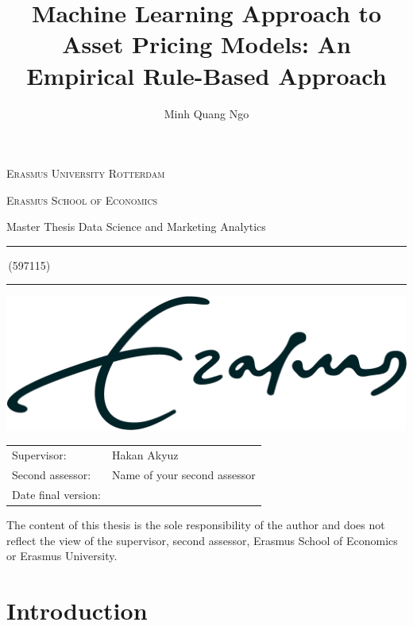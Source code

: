 \documentclass[a4paper,11pt]{article}
\author{Minh Quang Ngo}
\title{Machine Learning Approach to Asset Pricing Models: An Empirical Rule-Based Approach}
\newcommand{\studentnumber}{597115}
\newcommand{\program}{Data Science and Marketing Analytics}
\newcommand{\supervisor}{Hakan Akyuz}
\newcommand{\secondassesor}{Name of your second assessor}
\begin{document}
\begin{titlepage}
\makeatletter
\begin{center}
	\textsc{Erasmus University Rotterdam}
	\par \textsc{Erasmus School of Economics}
	\par Master Thesis \program

	\vfill \hrule height .08em \bigskip
	\par\huge\@title\bigskip
	\par\Large\@author\,(\studentnumber)\bigskip
	\hrule height .08em\normalsize
	
	\vfill
	\includegraphics[width=\textwidth,height=0.15\textheight,keepaspectratio]{eur} %
	\vfill
	
	\begin{tabular}{ll}
		\toprule
		Supervisor: & \supervisor\\
		Second assessor: & \secondassesor\\
		Date final version: & \@date\\
		\bottomrule
	\end{tabular}
	
	\vfill
	The content of this thesis is the sole responsibility of the author and does not reflect the view of the supervisor, second assessor, Erasmus School of Economics or Erasmus University.
\end{center}
\makeatother
\end{titlepage}

\begin{abstract}
	
\end{abstract}
\newpage

\tableofcontents
\newpage

\section{Introduction} \label{sec:introduction}
    
\end{document}
